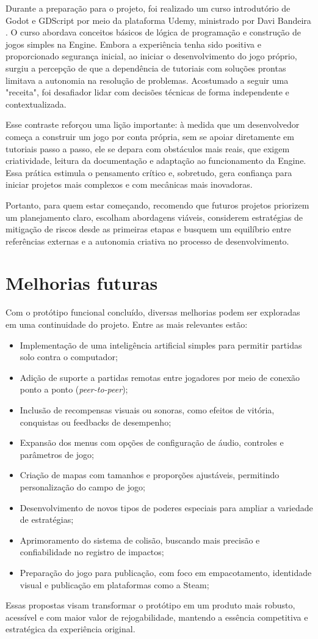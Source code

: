 Durante a preparação para o projeto, foi realizado um curso introdutório de Godot e GDScript por meio da plataforma Udemy, ministrado por Davi Bandeira \cite{bandeira2024godot}. O curso abordava conceitos básicos de lógica de programação e construção de jogos simples na Engine. Embora a experiência tenha sido positiva e proporcionado segurança inicial, ao iniciar o desenvolvimento do jogo próprio, surgiu a percepção de que a dependência de tutoriais com soluções prontas limitava a autonomia na resolução de problemas. Acostumado a seguir uma "receita", foi desafiador lidar com decisões técnicas de forma independente e contextualizada.

Esse contraste reforçou uma lição importante: à medida que um desenvolvedor começa a construir um jogo por conta própria, sem se apoiar diretamente em tutoriais passo a passo, ele se depara com obstáculos mais reais, que exigem criatividade, leitura da documentação e adaptação ao funcionamento da Engine. Essa prática estimula o pensamento crítico e, sobretudo, gera confiança para iniciar projetos mais complexos e com mecânicas mais inovadoras.

Portanto, para quem estar começando, recomendo que futuros projetos priorizem um planejamento claro, escolham abordagens viáveis, considerem estratégias de mitigação de riscos desde as primeiras etapas e busquem um equilíbrio entre referências externas e a autonomia criativa no processo de desenvolvimento.


\section{Melhorias futuras}

Com o protótipo funcional concluído, diversas melhorias podem ser exploradas em uma continuidade do projeto. Entre as mais relevantes estão:

\begin{itemize}
  \item Implementação de uma inteligência artificial simples para permitir partidas solo contra o computador;
  \item Adição de suporte a partidas remotas entre jogadores por meio de conexão ponto a ponto (\textit{peer-to-peer});
  \item Inclusão de recompensas visuais ou sonoras, como efeitos de vitória, conquistas ou feedbacks de desempenho;
  \item Expansão dos menus com opções de configuração de áudio, controles e parâmetros de jogo;
  \item Criação de mapas com tamanhos e proporções ajustáveis, permitindo personalização do campo de jogo;
  \item Desenvolvimento de novos tipos de poderes especiais para ampliar a variedade de estratégias;
  \item Aprimoramento do sistema de colisão, buscando mais precisão e confiabilidade no registro de impactos;
  \item Preparação do jogo para publicação, com foco em empacotamento, identidade visual e publicação em plataformas como a Steam;
\end{itemize}

Essas propostas visam transformar o protótipo em um produto mais robusto, acessível e com maior valor de rejogabilidade, mantendo a essência competitiva e estratégica da experiência original.
